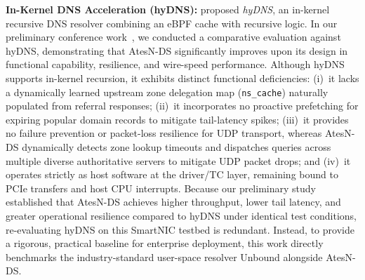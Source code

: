 \documentclass[a4paper,fleqn,colorlinks,hidelinks]{cas-sc}
\begin{document}
\textbf{In-Kernel DNS Acceleration (hyDNS):} \citet{10.1145/3672197.3673439} proposed \textit{hyDNS}, an in-kernel recursive DNS resolver combining an eBPF cache with recursive logic. In our preliminary conference work~\citep{sbesc_estendido}, we conducted a comparative evaluation against hyDNS, demonstrating that AtesN-DS significantly improves upon its design in functional capability, resilience, and wire-speed performance. Although hyDNS supports in-kernel recursion, it exhibits distinct functional deficiencies: (i)~it lacks a dynamically learned upstream zone delegation map (\texttt{ns\_cache}) naturally populated from referral responses; (ii)~it incorporates no proactive prefetching for expiring popular domain records to mitigate tail-latency spikes; (iii)~it provides no failure prevention or packet-loss resilience for UDP transport, whereas AtesN-DS dynamically detects zone lookup timeouts and dispatches queries across multiple diverse authoritative servers to mitigate UDP packet drops; and (iv)~it operates strictly as host software at the driver/TC layer, remaining bound to PCIe transfers and host CPU interrupts. Because our preliminary study established that AtesN-DS achieves higher throughput, lower tail latency, and greater operational resilience compared to hyDNS under identical test conditions, re-evaluating hyDNS on this SmartNIC testbed is redundant. Instead, to provide a rigorous, practical baseline for enterprise deployment, this work directly benchmarks the industry-standard user-space resolver Unbound alongside AtesN-DS.
\end{document}
